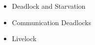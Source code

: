 \documentclass[12pt]{article}
\begin{document}
\begin{itemize}
    \item Deadlock and Starvation
    \item Communication Deadlocks
    \item Livelock
\end{itemize}
\end{document}
